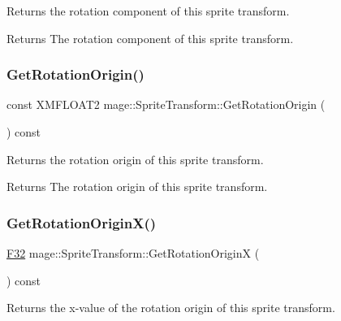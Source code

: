 Returns the rotation component of this sprite transform.

\begin{DoxyReturn}{Returns}
The rotation component of this sprite transform. 
\end{DoxyReturn}
\hypertarget{classmage_1_1_sprite_transform_aa7a6f3cad38ed9231455de722e60040c}{}\label{classmage_1_1_sprite_transform_aa7a6f3cad38ed9231455de722e60040c} 
\subsubsection{\texorpdfstring{Get\+Rotation\+Origin()}{GetRotationOrigin()}}
{\footnotesize\ttfamily const X\+M\+F\+L\+O\+A\+T2 mage\+::\+Sprite\+Transform\+::\+Get\+Rotation\+Origin (\begin{DoxyParamCaption}{ }\end{DoxyParamCaption}) const\hspace{0.3cm}{\ttfamily [noexcept]}}

Returns the rotation origin of this sprite transform.

\begin{DoxyReturn}{Returns}
The rotation origin of this sprite transform. 
\end{DoxyReturn}
\hypertarget{classmage_1_1_sprite_transform_a980beb77dc4b64a2d784361d61981f9c}{}\label{classmage_1_1_sprite_transform_a980beb77dc4b64a2d784361d61981f9c} 
\subsubsection{\texorpdfstring{Get\+Rotation\+Origin\+X()}{GetRotationOriginX()}}
{\footnotesize\ttfamily \hyperlink{namespacemage_aa97e833b45f06d60a0a9c4fc22ae02c0}{F32} mage\+::\+Sprite\+Transform\+::\+Get\+Rotation\+OriginX (\begin{DoxyParamCaption}{ }\end{DoxyParamCaption}) const\hspace{0.3cm}{\ttfamily [noexcept]}}

Returns the x-\/value of the rotation origin of this sprite transform.


